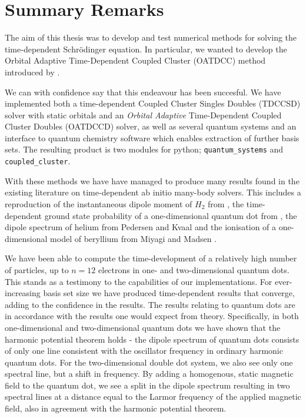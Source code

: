 \chapter{Summary Remarks}
\label{ch:conclusion}

The aim of this thesis was to develop and test numerical methods for 
solving the time-dependent Schrödinger equation. In particular, we 
wanted to develop the Orbital Adaptive Time-Dependent Coupled Cluster 
(OATDCC) method introduced by \citeauthor{kvaal2012ab} \cite{kvaal2012ab}.

We can with confidence say that this endeavour has been succesful.
We have implemented both 
a time-dependent Coupled Cluster Singles Doubles (TDCCSD) solver with 
static orbitals and an \emph{Orbital Adaptive} Time-Dependent Coupled Cluster 
Doubles (OATDCCD) solver, as well as several quantum systems and an interface 
to quantum chemistry software which enables extraction of further basis sets.
The resulting product is two modules for python; \lstinline{quantum_systems} 
and \lstinline{coupled_cluster}.

With these methods we have have managed to produce 
many results found in the existing literature on time-dependent ab initio 
many-body solvers. This includes a reproduction of the instantaneous dipole moment
of $H_2$ from \citeauthor{li2005time} \cite{li2005time}, the time-dependent 
ground state probability of a one-dimensional quantum dot from 
\citeauthor{Zanghellini04} \cite{Zanghellini04}, the dipole spectrum of 
helium from Pedersen and Kvaal \cite{pedersen2019symplectic}
and the ionisation of a one-dimensional model of beryllium from 
Miyagi and Madsen \cite{miyagi2013time}.

We have been able to compute the time-development 
of a relatively high number of particles, up to $n=12$ electrons in one- and
two-dimensional quantum dots. This stands as a testimony to the capabilities
of our implementations. For ever-increasing basis set size we have produced 
time-dependent results that converge, adding to the confidence in the results.
The results relating to quantum dots are in accordance with the 
results one would expect from theory. Specifically, in both one-dimensional 
and two-dimensional quantum dots we have shown that the harmonic potential 
theorem \cite{kohn1961cyclotron} holds - the dipole spectrum of quantum 
dots consists of only one line consistent with the oscillator frequency in 
ordinary harmonic quantum dots. For the two-dimensional double dot system,
we also see only one spectral line, but a shift in frequency. By adding a homogenous,
static magnetic field to the quantum dot, we see a split in the dipole spectrum 
resulting in two spectral lines at a distance equal to the Larmor frequency of 
the applied magnetic field, also in agreement with the harmonic potential theorem.

